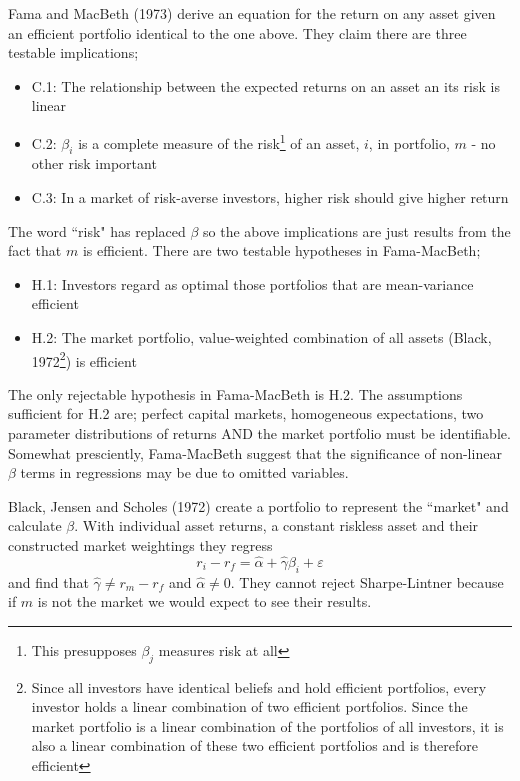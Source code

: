 Fama and MacBeth (1973)\cite{fama1973risk} derive an equation for the return on any asset
given an efficient portfolio identical to the one above. They claim there are three
testable implications;
\begin{itemize}
    \item C.1: The relationship between the expected returns on an asset an its risk is linear
    \item C.2: $\beta_i$ is a complete measure of the risk\footnote{This presupposes $\beta_j$ measures risk at all} of an asset, $i$, in portfolio, $m$ - no other risk important
    \item C.3: In a market of risk-averse investors, higher risk should give higher return
\end{itemize}
The word ``risk" has replaced $\beta$ so the above implications are just results from the
fact that $m$ is efficient. There are two testable hypotheses in Fama-MacBeth;
\begin{itemize}
    \item H.1: Investors regard as optimal those portfolios that are mean-variance efficient
    \item H.2: The market portfolio, value-weighted combination of all assets (Black, 1972\cite{black1972capital}\footnote{
    Since all investors have identical beliefs and hold efficient portfolios, every investor holds a linear combination of two efficient portfolios. Since the market portfolio is a linear combination of the portfolios of all investors, it is also a linear combination of these two efficient portfolios and is therefore efficient
    }) is efficient
\end{itemize}
The only rejectable hypothesis in Fama-MacBeth is H.2. The assumptions sufficient for H.2
are; perfect capital markets, homogeneous expectations, two parameter distributions of
returns AND the market portfolio must be identifiable.
Somewhat presciently, Fama-MacBeth suggest that the significance of non-linear $\beta$
terms in regressions may be due to omitted variables.

Black, Jensen and Scholes (1972)\cite{jensen1972capital} create a portfolio to represent
the ``market" and calculate $\beta$. With individual asset returns, a constant riskless
asset and their constructed market weightings they regress
$$r_i-r_f=\hat{\alpha}+\hat{\gamma}\beta_i+\varepsilon$$
and find that $\hat{\gamma}\neq r_m-r_f$ and $\hat{\alpha}\neq 0$. They cannot reject
Sharpe-Lintner because if $m$ is not the market we would expect to see their results.

